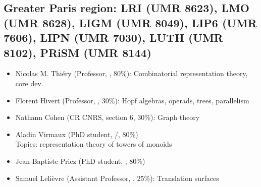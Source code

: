 \subsection*{Greater Paris region: LRI (UMR 8623),  LMO (UMR 8628), LIGM
  (UMR 8049), LIP6 (UMR 7606), LIPN (UMR 7030), LUTH (UMR 8102), PRiSM (UMR 8144)}


\begin{itemize}
\item Nicolas M. Thiéry (Professor, \CS, 80\%): Combinatorial
  representation theory, core dev.
\item Florent Hivert (Professor, \CS, 30\%): Hopf algebras, operads,
  trees, parallelism%
\item Nathann Cohen (CR CNRS, section 6, 30\%): Graph theory%
\item Aladin Virmaux (PhD student, \MATH/\CS, 80\%)\\
  Topics: representation theory of towers of monoids
\item Jean-Baptiste Priez (PhD student, \CS, 80\%)
\item Samuel Lelièvre (Assistant Professor, \MATH, 25\%): %
  Translation surfaces%



\end{itemize}
